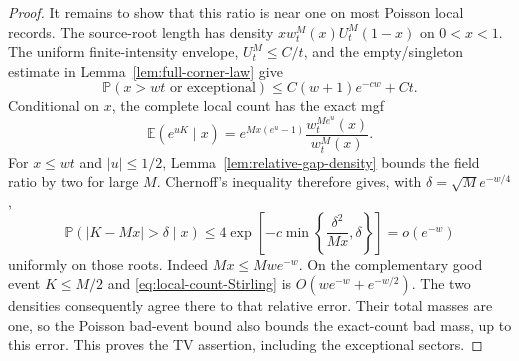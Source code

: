 \documentclass[11pt,letterpaper]{article}
\newcommand{\PP}{\mathbb P}\newcommand{\EE}{\mathbb E}
\begin{document}
\begin{proof}
It remains to show that this ratio is near one on most Poisson
local records. The source-root length has density
$xw_t^M(x)U_t^M(1-x)$ on $0<x<1$. The uniform finite-intensity
envelope, $U_t^M\le C/t$, and the empty/singleton estimate in
Lemma~\ref{lem:full-corner-law} give
\[
 \PP(x>wt\text{ or exceptional})\le C(w+1)e^{-cw}+Ct.
\]
Conditional on $x$, the complete local count has the exact mgf
\[
 \EE(e^{uK}\mid x)
 =e^{Mx(e^u-1)}\frac{w_t^{Me^u}(x)}{w_t^M(x)}.
\]
For $x\le wt$ and $|u|\le1/2$, Lemma~\ref{lem:relative-gap-density}
bounds the field ratio by two for large $M$. Chernoff's inequality
therefore gives, with $\delta=\sqrt M e^{-w/4}$,
\[
 \PP(|K-Mx|>\delta\mid x)
 \le4\exp\left[-c\min\left\{\frac{\delta^2}{Mx},\delta\right\}\right]
                       =o(e^{-w})
\]
uniformly on those roots. Indeed $Mx\le Mw e^{-w}$.
On the complementary good event $K\le M/2$ and
\eqref{eq:local-count-Stirling} is $O(we^{-w}+e^{-w/2})$.
The two densities consequently agree there to that relative error.
Their total masses are one, so the Poisson bad-event bound also
bounds the exact-count bad mass, up to this error. This proves
the TV assertion, including the exceptional sectors.
\end{proof}
\end{document}
